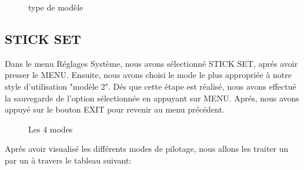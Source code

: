 	\begin{figure}[h]
		\begin{center}
			\centering
		\end{center}
		\caption{type de modèle}
	\end{figure}
	\subsection{STICK SET }
	Dans le menu Réglages Système, nous avons sélectionné STICK SET, aprés avoir presser le MENU. Ensuite, nous avons choisi le mode le plus appropriée à notre style d'utilisation "modèle 2". Dés que cette étape est réalisé, nous avons effectué la sauvegarde de l'option sélectionnée en appuyant sur MENU. Aprés, nous avons appuyé sur le bouton EXIT pour revenir au menu précédent.
	\begin{figure}[h]
		\begin{center}
			\centering
		\end{center}
		\caption{Les 4 modes}
	\end{figure}
	\newpage
	Aprés avoir visualisé les différents modes de pilotage, nous allons les traiter un par un à travers le tableau suivant:
